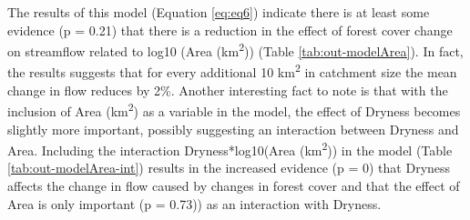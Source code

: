 \documentclass[]{elsarticle} %
\begin{document}
The results of this model (Equation \eqref{eq:eq6}) indicate there is at least some evidence (p = 0.21) that there is a reduction in the effect of forest cover change on streamflow related to log10 (Area (km\textsuperscript{2})) (Table \ref{tab:out-modelArea}). In fact, the results suggests that for every additional 10 km\textsuperscript{2} in catchment size the mean change in flow reduces by 2\%. Another interesting fact to note is that with the inclusion of Area (km\textsuperscript{2}) as a variable in the model, the effect of Dryness becomes slightly more important, possibly suggesting an interaction between Dryness and Area. Including the interaction Dryness*log10(Area (km\textsuperscript{2})) in the model (Table \ref{tab:out-modelArea-int}) results in the increased evidence (p = 0) that Dryness affects the change in flow caused by changes in forest cover and that the effect of Area is only important (p = 0.73)) as an interaction with Dryness.
\end{document}
